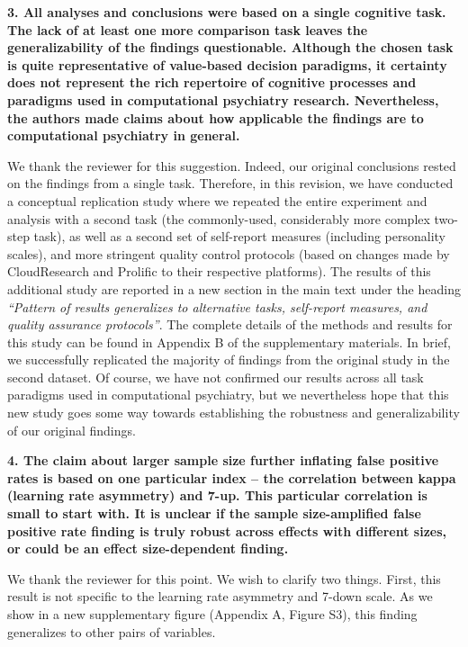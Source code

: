 \documentclass[a4paper,notitlepage,12pt]{article}
\begin{document}
\textbf{3. All analyses and conclusions were based on a single cognitive task. The lack of at least one more comparison task leaves the generalizability of the findings questionable. Although the chosen task is quite representative of value-based decision paradigms, it certainty does not represent the rich repertoire of cognitive processes and paradigms used in computational psychiatry research. Nevertheless, the authors made claims about how applicable the findings are to computational psychiatry in general.}

We thank the reviewer for this suggestion. Indeed, our original conclusions rested on the findings from a single task. Therefore, in this revision, we have conducted a conceptual replication study where we repeated the entire experiment and analysis with a second task (the commonly-used, considerably more complex two-step task), as well as a second set of self-report measures (including personality scales), and more stringent quality control protocols (based on changes made by CloudResearch and Prolific to their respective platforms). The results of this additional study are reported in a new section in the main text under the heading \textit{``Pattern of results generalizes to alternative tasks, self-report measures, and quality assurance protocols''}. The complete details of the methods and results for this study can be found in Appendix B of the supplementary materials. In brief, we successfully replicated the majority of findings from the original study in the second dataset. Of course, we have not confirmed our results across all task paradigms used in computational psychiatry, but we nevertheless hope that this new study goes some way towards establishing the robustness and generalizability of our original findings. 

\textbf{4. The claim about larger sample size further inflating false positive rates is based on one particular index – the correlation between kappa (learning rate asymmetry) and 7-up. This particular correlation is small to start with. It is unclear if the sample size-amplified false positive rate finding is truly robust across effects with different sizes, or could be an effect size-dependent finding.}

We thank the reviewer for this point. We wish to clarify two things. First, this result is not specific to the learning rate asymmetry and 7-down scale. As we show in a new supplementary figure (Appendix A, Figure S3), this finding generalizes to other pairs of variables. 
\end{document}
